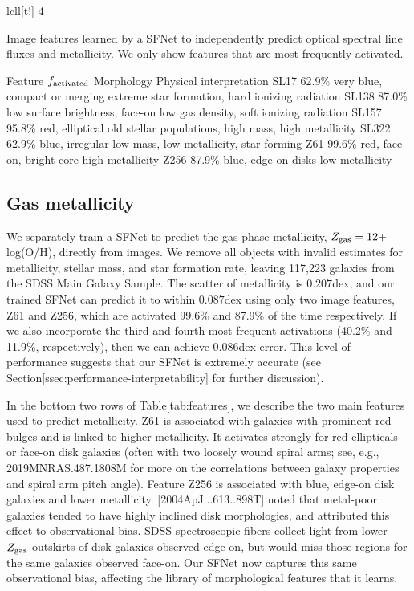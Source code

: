 \documentclass[11pt,a4paper]{article}
\begin{document}
lcll[t!] 4

Image features learned by a SFNet to independently predict optical spectral line fluxes and metallicity. We only show features that are most frequently activated.

Feature $f_{\rm activated}$ Morphology Physical interpretation SL17  62.9\%  very blue, compact or merging  extreme star formation, hard ionizing radiation SL138  87.0\%  low surface brightness, face-on  low gas density, soft ionizing radiation SL157  95.8\%  red, elliptical  old stellar populations, high mass, high metallicity SL322  62.9\%  blue, irregular  low mass, low metallicity, star-forming Z61  99.6\%  red, face-on, bright core  high metallicity Z256  87.9\%  blue, edge-on disks  low metallicity

\subsection{Gas metallicity}

We separately train a SFNet to predict the gas-phase metallicity, $Z_{\rm gas} = 12 +$log(O/H), directly from images. We remove all objects with invalid estimates for metallicity, stellar mass, and star formation rate, leaving 117,223 galaxies from the SDSS Main Galaxy Sample. The scatter of metallicity is $0.207$dex, and our trained SFNet can predict it to within $0.087$dex using only two image features, Z61 and Z256, which are activated 99.6\% and 87.9\% of the time respectively. If we also incorporate the third and fourth most frequent activations (40.2\% and 11.9\%, respectively), then we can achieve $0.086$dex error. This level of performance suggests that our SFNet is extremely accurate (see Section[ssec:performance-interpretability] for further discussion).

In the bottom two rows of Table[tab:features], we describe the two main features used to predict metallicity. Z61 is associated with galaxies with prominent red bulges and is linked to higher metallicity. It activates strongly for red ellipticals or face-on disk galaxies (often with two loosely wound spiral arms; see, e.g., 2019MNRAS.487.1808M for more on the correlations between galaxy properties and spiral arm pitch angle).  Feature Z256 is associated with blue, edge-on disk galaxies and lower metallicity. [2004ApJ...613..898T] noted that metal-poor galaxies tended to have highly inclined disk morphologies, and attributed this effect to observational bias. SDSS spectroscopic fibers collect light from lower-$Z_{\rm gas}$  outskirts of disk galaxies observed edge-on, but would miss those regions for the same galaxies observed face-on. Our SFNet now captures this same observational bias, affecting the library of morphological features that it learns.
\end{document}
